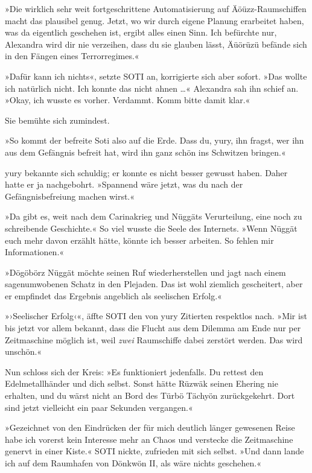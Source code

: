 »Die wirklich sehr weit fortgeschrittene Automatisierung auf Äöüzz-Raumschiffen macht das plausibel genug. Jetzt, wo wir durch eigene Planung erarbeitet haben, was da eigentlich geschehen ist, ergibt alles einen Sinn. Ich befürchte nur, Alexandra wird dir nie verzeihen, dass du sie glauben lässt, Äüörüzü befände sich in den Fängen eines Terrorregimes.«

»Dafür kann ich nichts«, setzte SOTI an, korrigierte sich aber sofort. »Das wollte ich natürlich nicht. Ich konnte das nicht ahnen …« Alexandra sah ihn schief an. »Okay, ich wusste es vorher. Verdammt. Komm bitte damit klar.«

Sie bemühte sich zumindest.

»So kommt der befreite Soti also auf die Erde. Dass du, yury, ihn fragst, wer ihn aus dem Gefängnis befreit hat, wird ihn ganz schön ins Schwitzen bringen.«

yury bekannte sich schuldig; er konnte es nicht besser gewusst haben. Daher hatte er ja nachgebohrt. »Spannend wäre jetzt, was du nach der Gefängnisbefreiung machen wirst.«

»Da gibt es, weit nach dem Carinakrieg und Nüggäts Verurteilung, eine noch zu schreibende Geschichte.« So viel wusste die Seele des Internets. »Wenn Nüggät euch mehr davon erzählt hätte, könnte ich besser arbeiten. So fehlen mir Informationen.«

»Dögöbörz Nüggät möchte seinen Ruf wiederherstellen und jagt nach einem sagenumwobenen Schatz in den Plejaden. Das ist wohl ziemlich gescheitert, aber er empfindet das Ergebnis angeblich als seelischen Erfolg.«

»›Seelischer Erfolg‹«, äffte SOTI den von yury Zitierten respektlos nach. »Mir ist bis jetzt vor allem bekannt, dass die Flucht aus dem Dilemma am Ende nur per Zeitmaschine möglich ist, weil \emph{zwei} Raumschiffe dabei zerstört werden. Das wird unschön.«

Nun schloss sich der Kreis: »Es funktioniert jedenfalls. Du rettest den Edelmetallhänder und dich selbst. Sonst hätte Rüzwäk seinen Ehering nie erhalten, und du wärst nicht an Bord des Türbö Tächyön zurückgekehrt. Dort sind jetzt vielleicht ein paar Sekunden vergangen.«

»Gezeichnet von den Eindrücken der für mich deutlich länger gewesenen Reise habe ich vorerst kein Interesse mehr an Chaos und verstecke die Zeitmaschine genervt in einer Kiste.« SOTI nickte, zufrieden mit sich selbst. »Und dann lande ich auf dem Raumhafen von Dönkwön II, als wäre nichts geschehen.«

